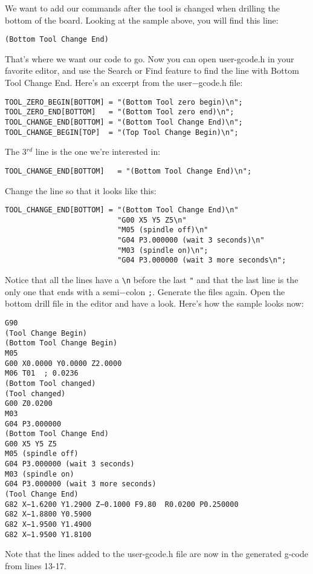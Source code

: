 \documentclass[11pt]{book}
\begin{document}
We want to add our commands after the tool is changed when drilling the bottom of the board. Looking at the sample above, you will find this line:
\begin{lstlisting}[firstnumber=12]
(Bottom Tool Change End)
\end{lstlisting}

That's where we want our code to go. Now you can open user-gcode.h in your favorite editor, and use the Search or Find feature to find the line with Bottom Tool Change End. Here's an excerpt from the user−gcode.h file:

\begin{lstlisting}
TOOL_ZERO_BEGIN[BOTTOM]	= "(Bottom Tool zero begin)\n";
TOOL_ZERO_END[BOTTOM]	= "(Bottom Tool zero end)\n";
TOOL_CHANGE_END[BOTTOM]	= "(Bottom Tool Change End)\n";
TOOL_CHANGE_BEGIN[TOP]	= "(Top Tool Change Begin)\n";
\end{lstlisting}
The 3$^{rd}$ line is the one we're interested in:
\begin{lstlisting}[firstnumber=3]
TOOL_CHANGE_END[BOTTOM]   = "(Bottom Tool Change End)\n";
\end{lstlisting}
Change the line so that it looks like this:
\begin{lstlisting}[firstnumber=3]
TOOL_CHANGE_END[BOTTOM] = "(Bottom Tool Change End)\n"
                          "G00 X5 Y5 Z5\n"
                          "M05 (spindle off)\n"
                          "G04 P3.000000 (wait 3 seconds)\n"
                          "M03 (spindle on)\n";
                          "G04 P3.000000 (wait 3 more seconds\n";
\end{lstlisting}

Notice that all the lines have a \lstinline!\n! before the last \lstinline!"! and that the last line is the only one that ends with a semi−colon \lstinline!;!.
Generate the files again. Open the bottom drill file in the editor and have a look. Here's how the sample looks now:
\begin{lstlisting}
G90
(Tool Change Begin)
(Bottom Tool Change Begin)
M05
G00 X0.0000 Y0.0000 Z2.0000
M06 T01  ; 0.0236
(Bottom Tool changed)
(Tool changed)
G00 Z0.0200
M03
G04 P3.000000
(Bottom Tool Change End)
G00 X5 Y5 Z5
M05 (spindle off)
G04 P3.000000 (wait 3 seconds)
M03 (spindle on)
G04 P3.000000 (wait 3 more seconds)
(Tool Change End)
G82 X−1.6200 Y1.2900 Z−0.1000 F9.80  R0.0200 P0.250000
G82 X−1.8800 Y0.5900
G82 X−1.9500 Y1.4900
G82 X−1.9500 Y1.8100
\end{lstlisting}
Note that the lines added to the user-gcode.h file are now in the generated g-code from lines 13-17.
\end{document}
